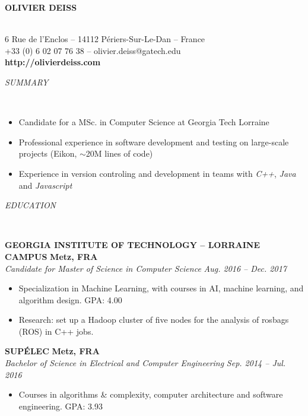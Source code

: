 \documentclass[a4paper, 12pt]{article}
\newcommand{\marginline}{-0.3cm}
\newcommand{\margincontent}{-0.6cm}
\newcommand{\marginsummary}{-0.3cm}
\newcommand{\marginbeforesection}{0.3cm}
\newcommand{\marginaftersummary}{0.2cm}
\newcommand{\linewidthperso}{0.02cm}
\newcommand{\stylesection}[1]{
  \vspace{\marginbeforesection}
  \begin{normalsize}\textit{#1}\end{normalsize}
  \vspace{\marginline}\\
  \noindent\makebox[\linewidth]{\rule{\textwidth}{\linewidthperso}}

}
\newcommand{\styletitle}[1]{\textbf{#1}}
\newcommand{\styledesc}[1]{\textit{#1}}
\newcommand{\styleloc}[1]{\textbf{#1}}
\newcommand{\styledates}[1]{\textit{#1}}
\begin{document}
\begin{footnotesize}

\begin{center}
  \begin{small}\textbf{OLIVIER DEISS}\end{small}\\
  6 Rue de l'Enclos -- 14112 P\'eriers-Sur-Le-Dan -- France\\
  +33 (0) 6 02 07 76 38 -- olivier.deiss@gatech.edu\\
  \textbf{http://olivierdeiss.com}
\end{center}

\stylesection{SUMMARY}

\vspace{\marginsummary}
\begin{itemize}
  \item Candidate for a MSc. in Computer Science at Georgia Tech Lorraine
  \item Professional experience in software development and testing on large-scale projects (Eikon, $\sim$20M lines of code)
  \item Experience in version controling and development in teams with \textit{C++}, \textit{Java} and \textit{Javascript}
\end{itemize}
\vspace{\marginaftersummary}

\stylesection{EDUCATION}

\styletitle{GEORGIA INSTITUTE OF TECHNOLOGY -- LORRAINE CAMPUS} \hfill \styleloc{Metz, FRA}\\
\styledesc{Candidate for Master of Science in Computer Science} \hfill \styledates{Aug. 2016 -- Dec. 2017}\\
\vspace{\margincontent}
\begin{itemize}
  \item Specialization in Machine Learning, with courses in AI, machine learning, and algorithm design. \hfill GPA: 4.00
  \item Research: set up a Hadoop cluster of five nodes for the analysis of rosbags (ROS) in C++ jobs.
\end{itemize}

\styletitle{SUP\'ELEC} \hfill \styleloc{Metz, FRA}\\
\styledesc{Bachelor of Science in Electrical and Computer Engineering} \hfill \styledates{Sep. 2014 -- Jul. 2016}\\
\vspace{\margincontent}
\begin{itemize}
  \item Courses in algorithms \& complexity, computer architecture and software engineering. \hfill GPA: 3.93
\end{itemize}


\end{footnotesize}
\end{document}
